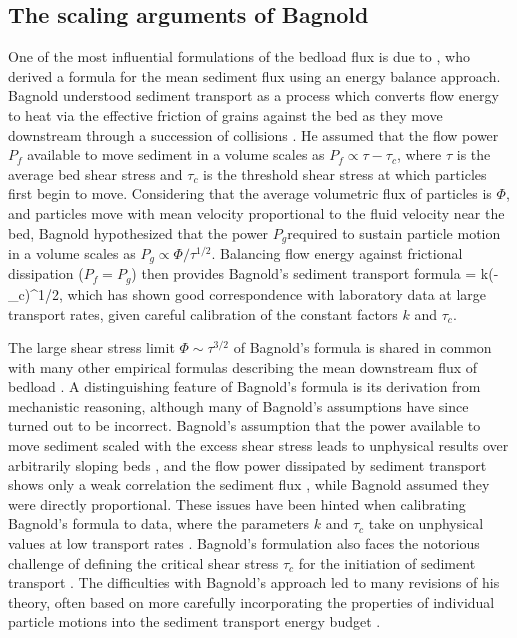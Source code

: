 \subsection{The scaling arguments of Bagnold}
\label{sec:baggo}

One of the most influential formulations of the bedload flux is due to \citet{Bagnold1956,Bagnold1966}, who derived a formula for the mean sediment flux using an energy balance approach.
Bagnold understood sediment transport as a process which converts flow energy to heat via the effective friction \citep{Bagnold1954} of grains against the bed as they move downstream through a succession of collisions \citep{Bagnold1973}.
He assumed that the flow power $P_f$ available to move sediment in a volume scales as $P_f \propto \tau - \tau_c$, where $\tau$ is the average bed shear stress and $\tau_c$ is the threshold shear stress at which particles first begin to move. 
Considering that the average volumetric flux of particles is $\Phi$, and particles move with mean velocity proportional to the fluid velocity near the bed, Bagnold hypothesized that the power $P_g$required to sustain particle motion in a volume scales as $P_g \propto \Phi/\tau^{1/2}.$
Balancing flow energy against frictional dissipation ($P_f = P_g$) then provides Bagnold's sediment transport formula
\be \Phi = k(\tau-\tau_c)\tau^{1/2}, \label{eq:bagnold}\ee
which has shown good correspondence with laboratory data at large transport rates, given careful calibration of the constant factors $k$ and $\tau_c$.

The large shear stress limit $\Phi \sim \tau^{3/2}$ of Bagnold's formula is shared in common with many other empirical formulas describing the mean downstream flux of bedload \citep[e.g.][]{MeyerPeter1948, Yalin1972, Wilcock2003, Parker1990}. A distinguishing feature of Bagnold's formula is its derivation from mechanistic reasoning, although many of Bagnold's assumptions have since turned out to be incorrect.
Bagnold's assumption that the power available to move sediment scaled with the excess shear stress leads to unphysical results over arbitrarily sloping beds \citep{Seminara2002}, and the flow power dissipated by sediment transport shows only a weak correlation the sediment flux \citep{Ancey2008}, while Bagnold assumed they were directly proportional. These issues have been hinted when calibrating Bagnold's formula to data, where the parameters $k$ and $\tau_c$ take on unphysical values at low transport rates \citep{Nino1996}.
Bagnold's formulation also faces the notorious challenge of defining the critical shear stress $\tau_c$ for the initiation of sediment transport \citep{Paintal1971,Kirchener1990,Houssais2015,Clark2017,Allen2018}.
The difficulties with Bagnold's approach led to many revisions of his theory, often based on more carefully incorporating the properties of individual particle motions into the sediment transport energy budget \citep{Engelund1976,Luque1976,Nino1998,Martin2000}.

